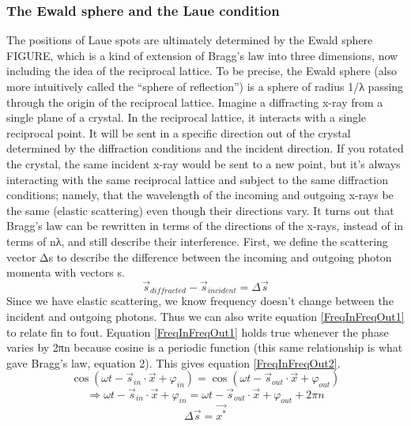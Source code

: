 \subsubsection{The Ewald sphere and the Laue condition}
The positions of Laue spots are ultimately determined by the Ewald sphere FIGURE, which is a kind of extension of Bragg’s law into three dimensions, now including the idea of the reciprocal lattice. To be precise, the Ewald sphere (also more intuitively called the “sphere of reflection”) is a sphere of radius 1/λ passing through the origin of the reciprocal lattice. 
Imagine a diffracting x-ray from a single plane of a crystal. In the reciprocal lattice, it interacts with a single reciprocal point. It will be sent in a specific direction out of the crystal determined by the diffraction conditions and the incident direction. If you rotated the crystal, the same incident x-ray would be sent to a new point, but it’s always interacting with the same reciprocal lattice and subject to the same diffraction conditions; namely, that the wavelength of the incoming and outgoing x-rays be the same (elastic scattering) even though their directions vary.
It turns out that Bragg’s law can be rewritten in terms of the directions of the x-rays, instead of in terms of nλ, and still describe their interference. First, we define the scattering vector Δs to describe the difference between the incoming and outgoing photon momenta with vectors s.
\begin{equation}
    \vec{s}_{diffracted}-\vec{s}_{incident}=\Delta\vec{s}
    \label{ScattVec}
\end{equation}
 Since we have elastic scattering, we know frequency doesn’t change between the incident and outgoing photons. Thus we can also write equation \ref{FreqInFreqOut1} to relate fin to fout. Equation \ref{FreqInFreqOut1} holds true whenever the phase varies by 2πn because cosine is a periodic function (this same relationship is what gave Bragg’s law, equation 2). This gives equation \ref{FreqInFreqOut2}. 
\begin{equation}
   \cos{(\omega t-\vec{s}_{in}\cdot\vec{x}+\varphi_{in})}=\cos{(\omega t-\vec{s}_{out}\cdot\vec{x}+\varphi_{out})}
    \label{FreqInFreqOut1}
\end{equation}
\begin{equation}
    \Rightarrow\omega t-\vec{s}_{in}\cdot\vec{x}+\varphi_{in}=\omega t-\vec{s}_{out}\cdot\vec{x}+\varphi_{out}+2\pi n
    \label{FreqInFreqOut2}
\end{equation}
\begin{equation}
    \Delta\vec{s}=\vec{x^*}
    \label{FreqInFreqOut3}
\end{equation}
